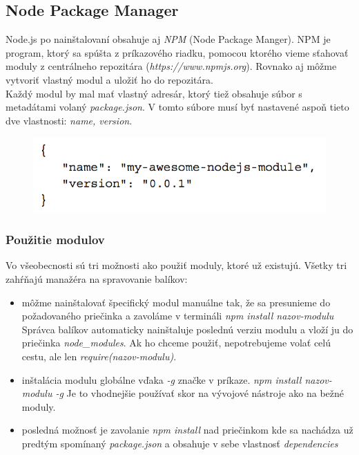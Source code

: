 \subsection{Node Package Manager}
Node.js po nainštalovaní obsahuje aj \textit{NPM} (Node Package Manger). NPM je program, ktorý sa spúšta z príkazového riadku, pomocou ktorého vieme sťahovať moduly z centrálneho repozitára (\textit{https://www.npmjs.org}). Rovnako aj môžme vytvoriť vlastný modul a uložiť ho do repozitára.\\
Každý modul by mal mať vlastný adresár, ktorý tiež obsahuje súbor s metadátami volaný \textit{package.json}. V tomto súbore musí byť nastavené aspoň tieto dve vlastnosti: \textit{name, version}.\cite{nodejs-by-example}

\begin{figure}[H]
  \centering
  \includegraphics[scale=0.7]{img/npm/npm-minimum.png}
\end{figure}

\subsubsection{Použitie modulov}
Vo všeobecnosti sú tri možnosti ako použiť moduly, ktoré už existujú. Všetky tri zahŕňajú manažéra na spravovanie balíkov:\cite{nodejs-by-example}
\begin{itemize}
\item môžme nainštalovať špecifický modul manuálne tak, že sa presunieme do požadovaného priečinka a zavoláme v termináli 
\textit{npm install nazov-modulu}
Správca balíkov automaticky nainštaluje poslednú verziu modulu a vloží ju do priečinka \textit{node\_modules}. Ak ho chceme použiť, nepotrebujeme volať celú cestu, ale len \textit{require(nazov-modulu)}.
\item inštalácia modulu globálne vďaka \textit{-g} značke v príkaze.
\textit{npm install nazov-modulu -g}
Je to vhodnejšie používať skor na vývojové nástroje ako na bežné moduly.
\item posledná možnosť je zavolanie
\textit{npm install}
nad priečinkom kde sa nachádza už predtým spomínaný \textit{package.json} a obsahuje v sebe vlastnosť \textit{dependencies}
\end{itemize}

